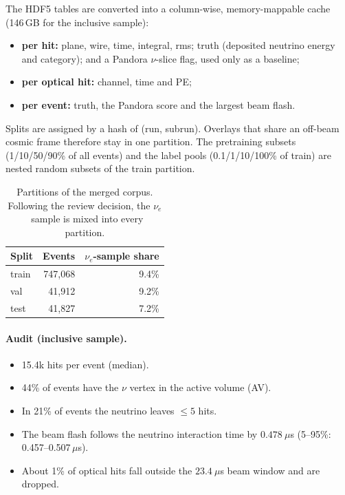 \documentclass[11pt,a4paper]{article}
\newcommand{\nue}{\ensuremath{\nu_e}}
\begin{document}
The HDF5 tables are converted into a column-wise, memory-mappable cache (146\,GB for the inclusive sample):
\begin{itemize}
  \item \textbf{per hit:} plane, wire, time, integral, rms; truth (deposited neutrino energy and category); and a Pandora $\nu$-slice flag, used only as a baseline;
  \item \textbf{per optical hit:} channel, time and PE;
  \item \textbf{per event:} truth, the Pandora score and the largest beam flash.
\end{itemize}

Splits are assigned by a hash of (run, subrun). Overlays that share an off-beam cosmic frame therefore stay in one partition. The pretraining subsets (1/10/50/90\% of all events) and the label pools (0.1/1/10/100\% of train) are nested random subsets of the train partition.

\begin{table}[h]
\centering\small
\caption{Partitions of the merged corpus. Following the review decision, the \nue\ sample is mixed into every partition.}
\begin{tabular}{lrr}
\toprule
Split & Events & \nue-sample share \\
\midrule
train & 747{,}068 & 9.4\% \\
val   & 41{,}912 & 9.2\% \\
test  & 41{,}827 & 7.2\% \\
\bottomrule
\end{tabular}
\end{table}

\paragraph{Audit (inclusive sample).}
\begin{itemize}
  \item 15.4k hits per event (median).
  \item 44\% of events have the $\nu$ vertex in the active volume (AV).
  \item In 21\% of events the neutrino leaves $\le 5$ hits.
  \item The beam flash follows the neutrino interaction time by $0.478~\mu$s (5--95\%: 0.457--0.507\,$\mu$s).
  \item About 1\% of optical hits fall outside the $23.4~\mu$s beam window and are dropped.
\end{itemize}
\end{document}
